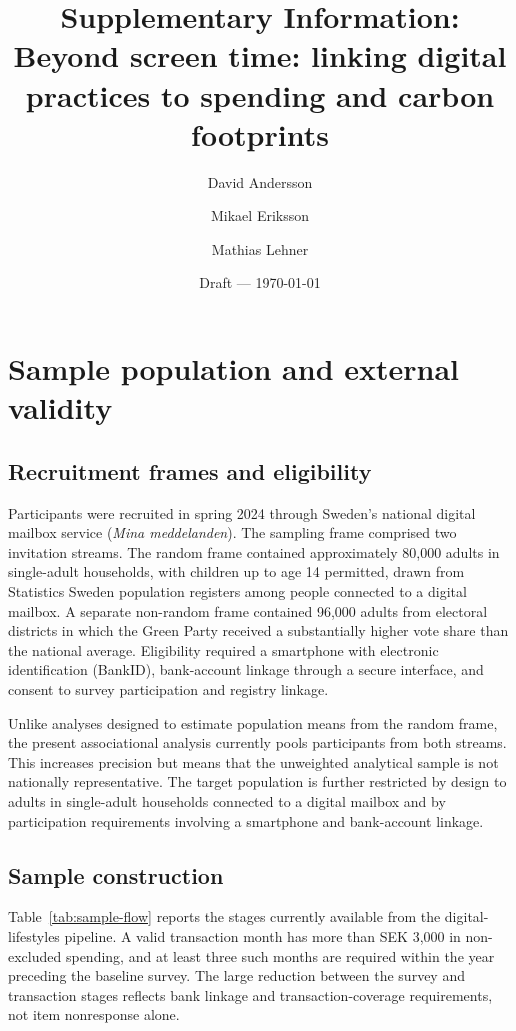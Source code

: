 \documentclass[11pt,a4paper]{article}
\title{Supplementary Information:\\
Beyond screen time: linking digital practices to spending and carbon footprints}
\author{David Andersson \and Mikael Eriksson \and Mathias Lehner}
\date{Draft --- \today}
\begin{document}
\maketitle

\section{Sample population and external validity}

\subsection{Recruitment frames and eligibility}
Participants were recruited in spring 2024 through Sweden's national digital
mailbox service (\emph{Mina meddelanden}). The sampling frame comprised two
invitation streams. The random frame contained approximately 80,000 adults in
single-adult households, with children up to age 14 permitted, drawn from
Statistics Sweden population registers among people connected to a digital
mailbox. A separate non-random frame contained 96,000 adults
from electoral districts in which the Green Party received a substantially
higher vote share than the national average. Eligibility required a smartphone
with electronic identification (BankID), bank-account linkage through a secure
interface, and consent to survey participation and registry linkage.

Unlike analyses designed to estimate population means from the random frame,
the present associational analysis currently pools participants from both
streams. This increases precision but means that the unweighted analytical
sample is not nationally representative. The target population is further
restricted by design to adults in single-adult households connected to a
digital mailbox and by participation requirements involving a smartphone and
bank-account linkage.

\subsection{Sample construction}
Table~\ref{tab:sample-flow} reports the stages currently available from the
digital-lifestyles pipeline. A valid transaction month has more than SEK 3,000
in non-excluded spending, and at least three such months are required within
the year preceding the baseline survey. The large reduction between the survey
and transaction stages reflects bank linkage and transaction-coverage
requirements, not item nonresponse alone.
\end{document}
